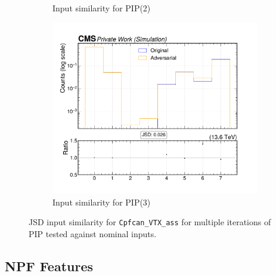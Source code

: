 \begin{figure}[htbp]
\begin{subfigure}[t]{0.32\textwidth}
    \caption{Input similarity for PIP(2)}
  \end{subfigure}\hfill
  \begin{subfigure}[t]{0.32\textwidth}
    \includegraphics[width=\linewidth]{media/output/features/compare/intprob_3/cmp_cpf_arr_Cpfcan_VTX_ass.pdf}
    \caption{Input similarity for PIP(3)}
  \end{subfigure}

  \caption{JSD input similarity for \texttt{Cpfcan\_VTX\_ass} for multiple iterations of PIP tested against nominal inputs.}
  \label{fig:intprob_input_Cpfcan_VTX_ass}
\end{figure}

\newpage
\subsection*{NPF Features}

